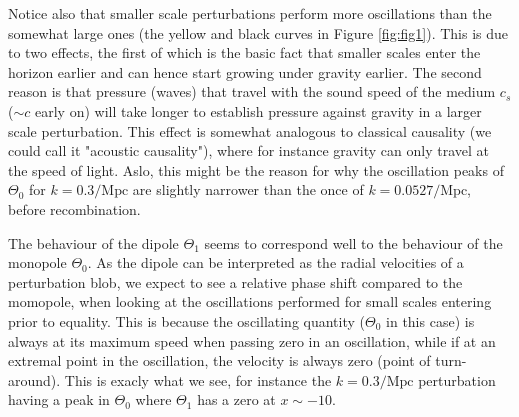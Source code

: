 \documentclass[twocolumn]{aastex62}
\begin{document}
Notice also that smaller scale perturbations perform more oscillations than the somewhat large ones (the yellow and black curves in Figure \ref{fig:fig1}). This is due to two effects, the first of which is the basic fact that smaller scales enter the horizon earlier and can hence start growing under gravity earlier. The second reason is that pressure (waves) that travel with the sound speed of the medium $c_s$ ($\sim c$ early on) will take longer to establish pressure against gravity in a larger scale perturbation. This effect is somewhat analogous to classical causality (we could call it "acoustic causality"), where for instance gravity can only travel at the speed of light. Aslo, this might be the reason for why the oscillation peaks of $\Theta_0$ for $k = 0.3/\mathrm{{Mpc}}$ are slightly narrower than the once of $k = 0.0527/\mathrm{Mpc}$, before recombination. 

The behaviour of the dipole $\Theta_1$ seems to correspond well to the behaviour of the monopole $\Theta_0$. As the dipole can be interpreted as the radial velocities of a perturbation blob, we expect to see a relative phase shift compared to the momopole, when looking at the oscillations performed for small scales entering prior to equality. This is because the oscillating quantity ($\Theta_0$ in this case) is always at its maximum speed when passing zero in an oscillation, while if at an extremal point in the oscillation, the velocity is always zero (point of turn-around). This is exacly what we see, for instance the $k = 0.3/\mathrm{Mpc}$ perturbation having a peak in $\Theta_0$ where $\Theta_1$ has a zero at $x\sim-10$.
\end{document}
